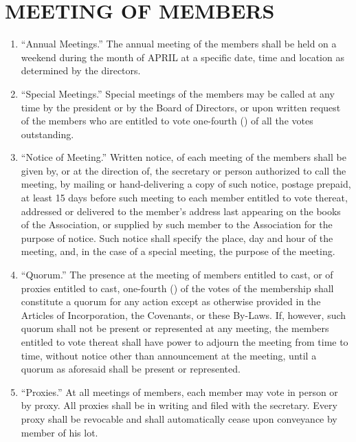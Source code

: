 \documentclass[10pt, letterpaper]{article}
\begin{document}
\section{MEETING OF MEMBERS}
\begin{enumerate}
  \item ``Annual Meetings.''
    The annual meeting of the members shall be held on a weekend during the month of APRIL at a specific date, time and location as determined by the directors.
  \item ``Special Meetings.''
    Special meetings of the members may be called at any time by the president or by the Board of Directors, or upon written request of the members who are entitled to vote one-fourth (\textonequarter) of all the votes outstanding.
  \item ``Notice of Meeting.''
    Written notice, of each meeting of the members shall be given by, or at the direction of, the secretary or person authorized to call the meeting, by mailing or hand-delivering a copy of such notice, postage prepaid, at least 15 days before such meeting to each member entitled to vote thereat, addressed or delivered to the member's address last appearing on the books of the Association, or supplied by such member to the Association for the purpose of notice.
    Such notice shall specify the place, day and hour of the meeting, and, in the case of a special meeting, the purpose of the meeting.
  \item ``Quorum.''
    The presence at the meeting of members entitled to cast, or of proxies entitled to cast, one-fourth (\textonequarter) of the votes of the membership shall constitute a quorum for any action except as otherwise provided in the Articles of Incorporation, the Covenants, or these By-Laws.
    If, however, such quorum shall not be present or represented at any meeting, the members entitled to vote thereat shall have power to adjourn the meeting from time to time, without notice other than announcement at the meeting, until a quorum as aforesaid shall be present or represented.
  \item ``Proxies.''
    At all meetings of members, each member may vote in person or by proxy.
    All proxies shall be in writing and filed with the secretary.
    Every proxy shall be revocable and shall automatically cease upon conveyance by member of his lot.
\end{enumerate}
\end{document}
